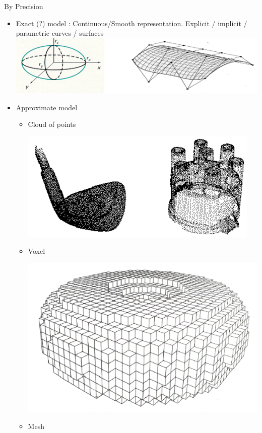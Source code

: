 \begin{frame}{By Precision}
\begin{itemize}
\item Exact (?) model : Continuous/Smooth representation. Explicit / implicit / parametric curves / surfaces
\includegraphics[scale=0.2]{images/CADExact.png}
\item Approximate model

	\begin{itemize}
	\item Cloud of points 

	\includegraphics[scale=0.12]{images/CADCloud.png}
	\item Voxel 

	\includegraphics[scale=0.12]{images/CADVoxel.png}
	\item Mesh


\end{itemize}
\end{itemize}
\end{frame}
